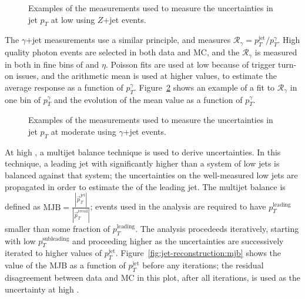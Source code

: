 
\begin{figure}
\centering
{}
\label{fig:jet-reconstruction:z_jet}
\caption{Examples of the measurements used to measure the uncertainties in jet $p_T$ at low \pt using $Z$+jet events.}
\end{figure}


The $\gamma$+jet measurements use a similar principle, and measures $\mathcal{R}_\gamma = p_T^\mathrm{jet} / p_T^\gamma$. High quality photon events are selected in both data and MC, and the $\mathcal{R}_\gamma$ is measured in both in fine bins of \pt and $\eta$. Poisson fits are used at low \pt because of trigger turn-on issues, and the arithmetic mean is used at higher values, to estimate the average response as a function of $p_T^\gamma$.  Figure~\ref{fig:jet-reconstruction:gamma_jet} shows an example of a fit to $\mathcal{R}_\gamma$ in one bin of $p_T^\gamma$ and the evolution of the mean value as a function of $p_T^\gamma$.


\begin{figure}
\centering
{}
\label{fig:jet-reconstruction:gamma_jet}
\caption{Examples of the measurements used to measure the uncertainties in jet $p_T$ at moderate \pt using $\gamma$+jet events.}
\end{figure}


At high \pt, a multijet balance technique is used to derive uncertainties. In this technique, a leading jet with \pt significantly higher than a system of low \pt jets is balanced against that system; the uncertainties on the well-measured low \pt jets are propagated in order to estimate the \pt of the leading jet. The multijet balance is defined as $\mathrm{MJB} = \frac{|\vec{p}_T^{\mathrm{jet}}|}{|\vec{p}_T^{\mathrm{recoil}}|} $; events used in the analysis are required to have $p_T^\mathrm{leading}$ smaller than some fraction of $p_T^\mathrm{leading}$. The analysis procedeeds iteratively, starting with low $p_T^\mathrm{subleading}$ and proceeding higher as the uncertainties are successively iterated to higher values of $p_T^\mathrm{jet}$. Figure~\ref{fig:jet-reconstruction:mjb} shows the value of the MJB as a function of $p_T^\mathrm{jet}$ before any iterations; the residual disagreement between data and MC in this plot, after all iterations, is used as the uncertainty at high \pt.

